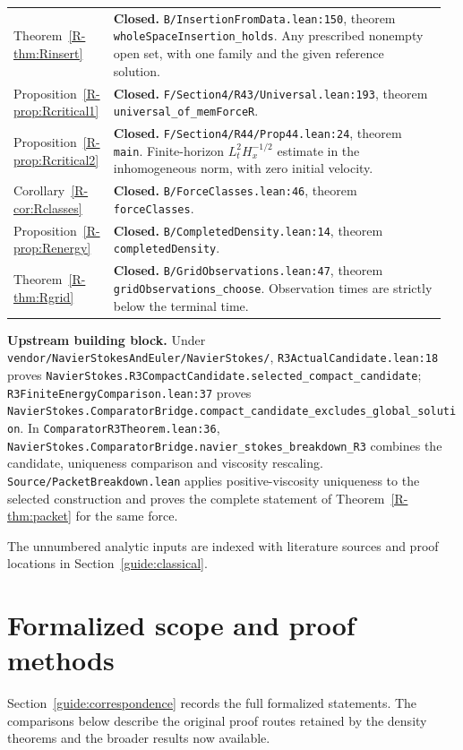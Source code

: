 \documentclass[11pt,a4paper]{article}
\newcommand{\code}[1]{\nolinkurl{#1}}
\newcommand{\paperref}[1]{\ref{R-#1}}
\newcommand{\source}[4]{\code{#1.lean:#2}, #4 \code{#3}}
\newcommand{\mapped}[2]{#1~\paperref{#2}}
\newcommand{\coverage}[1]{\textbf{#1.} }
\begin{document}
\begin{longtable}{@{}>{\raggedright\arraybackslash}p{0.20\linewidth}>{\raggedright\arraybackslash}p{0.76\linewidth}@{}}
\mapped{Theorem}{thm:Rinsert} & \coverage{Closed}\source{B/InsertionFromData}{150}{wholeSpaceInsertion_holds}{theorem}.
Any prescribed nonempty open set, with one family and the given reference solution. \\
\mapped{Proposition}{prop:Rcritical1} & \coverage{Closed}\source{F/Section4/R43/Universal}{193}{universal_of_memForceR}{theorem}. \\
\mapped{Proposition}{prop:Rcritical2} & \coverage{Closed}\source{F/Section4/R44/Prop44}{24}{main}{theorem}.
Finite-horizon $L^2_tH^{-1/2}_x$ estimate in the inhomogeneous norm,
with zero initial velocity. \\
\mapped{Corollary}{cor:Rclasses} & \coverage{Closed}\source{B/ForceClasses}{46}{forceClasses}{theorem}. \\
\mapped{Proposition}{prop:Renergy} & \coverage{Closed}\source{B/CompletedDensity}{14}{completedDensity}{theorem}. \\
\mapped{Theorem}{thm:Rgrid} & \coverage{Closed}\source{B/GridObservations}{47}{gridObservations_choose}{theorem}.
Observation times are strictly below the terminal time. \\
\end{longtable}
\endgroup

\noindent\textbf{Upstream building block.}
Under \code{vendor/NavierStokesAndEuler/NavierStokes/},
\code{R3ActualCandidate.lean:18} proves
\code{NavierStokes.R3CompactCandidate.selected_compact_candidate};
\code{R3FiniteEnergyComparison.lean:37} proves
\code{NavierStokes.ComparatorBridge.compact_candidate_excludes_global_solution}.
In \code{ComparatorR3Theorem.lean:36},
\code{NavierStokes.ComparatorBridge.navier_stokes_breakdown_R3} combines the
candidate, uniqueness comparison and viscosity rescaling.
\code{Source/PacketBreakdown.lean} applies positive-viscosity uniqueness to the
selected construction and proves the complete statement of
Theorem~\paperref{thm:packet} for the same force.

\smallskip
\noindent The unnumbered analytic inputs are indexed with literature sources
and proof locations in Section~\ref{guide:classical}.

\section{Formalized scope and proof methods}\label{guide:methods}
Section~\ref{guide:correspondence} records the full formalized statements.
The comparisons below describe the original proof routes retained by the
density theorems and the broader results now available.
\end{document}
